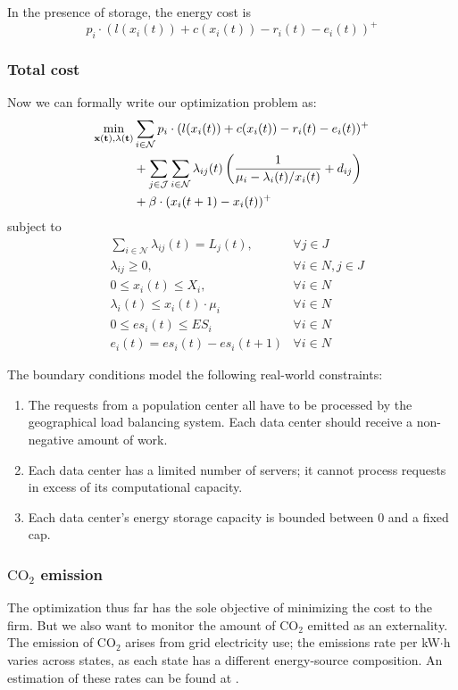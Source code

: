 \documentclass{acm_proc_article-sp}
\newcommand{\carbondioxide}{\ensuremath{\mathrm{CO}_2}}
\begin{document}
In the presence of storage, the energy cost is
\begin{equation}
p_i \cdot (l(x_i(t)) + c(x_i(t)) - r_i(t) - e_i(t))^+
\end{equation}

\subsubsection{Total cost}
Now we can formally write our optimization problem as:
\begin{align*}
\min_{\bf{x}(t), \bf{\lambda}(t)} & \sum_{i \in \mathcal{N}} p_i \cdot (l(x_i(t)) + c(x_i(t)) - r_i(t) - e_i(t))^+ \\
& + \sum_{j \in \mathcal{J}}\sum_{i \in \mathcal{N}}
\lambda_{ij}(t)\left(\frac{1}{\mu_i - \lambda_i(t)/x_i(t)} + d_{ij}\right) \\
& + \beta \cdot (x_i(t+1) - x_i(t))^+
\end{align*}
subject to
\begin{align*}
& \sum_{i\in \mathcal{N}}\lambda_{ij}(t) = L_j(t), &\forall j\in J \\
& \lambda_{ij} \geq 0, & \forall i\in N, j\in J \\
& 0 \leq x_i(t) \leq X_i, & \forall i \in N \\
& \lambda_i(t) \leq x_i(t) \cdot \mu_i & \forall i \in N \\
& 0 \leq es_i(t) \leq ES_i & \forall i \in N \\
& e_i(t) = es_i(t) - es_i(t+1) & \forall i \in N
\end{align*}

The boundary conditions model the following real-world constraints:
\begin{enumerate}
\item
The requests from a population center all have to be processed by the geographical load balancing system. Each data center should receive a non-negative amount of work.
\item
Each data center has a limited number of servers; it cannot process requests in excess of its computational capacity.
\item
Each data center’s energy storage capacity is bounded between $0$ and a fixed cap.
\end{enumerate}
\subsubsection{\carbondioxide{} emission}
The optimization thus far has the sole objective of minimizing the cost to the firm. But we also want to monitor the amount of \carbondioxide{} emitted as an externality. The emission of \carbondioxide{} arises from grid electricity use; the emissions rate per kW$\cdot{}$h varies across states, as each state has a different energy-source composition. An estimation of these rates can be found at \cite{carbon}.
\end{document}
